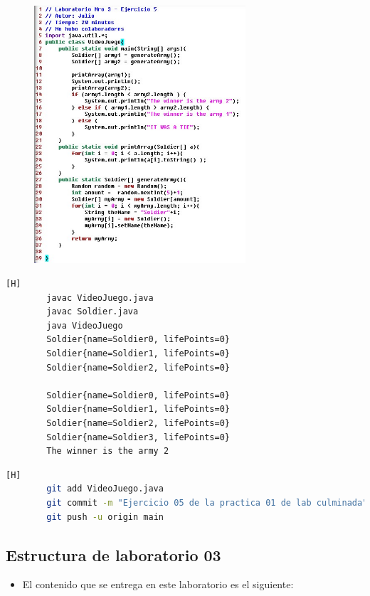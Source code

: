 \documentclass{article}
\begin{document}
	
	\begin{figure}[H]
		\centering
		\includegraphics[width=0.7\textwidth,keepaspectratio]{img/10.jpg}
	\end{figure}

	\begin{lstlisting}[language=bash,caption={Compilando y ejecutando VideoJuego.java}][H]
		javac VideoJuego.java
		javac Soldier.java
		java VideoJuego
		Soldier{name=Soldier0, lifePoints=0}
		Soldier{name=Soldier1, lifePoints=0}
		Soldier{name=Soldier2, lifePoints=0}
		
		Soldier{name=Soldier0, lifePoints=0}
		Soldier{name=Soldier1, lifePoints=0}
		Soldier{name=Soldier2, lifePoints=0}
		Soldier{name=Soldier3, lifePoints=0}
		The winner is the army 2
	\end{lstlisting}


	\begin{lstlisting}[language=bash,caption={Commit: Ejercicio 05 de la practica 01 de lab culminada }][H]
		git add VideoJuego.java
		git commit -m "Ejercicio 05 de la practica 01 de lab culminada"
		git push -u origin main
	\end{lstlisting}
	
	
	\subsection{Estructura de laboratorio 03}
	\begin{itemize}	
		\item El contenido que se entrega en este laboratorio es el siguiente:
	\end{itemize}
	
\end{document}
